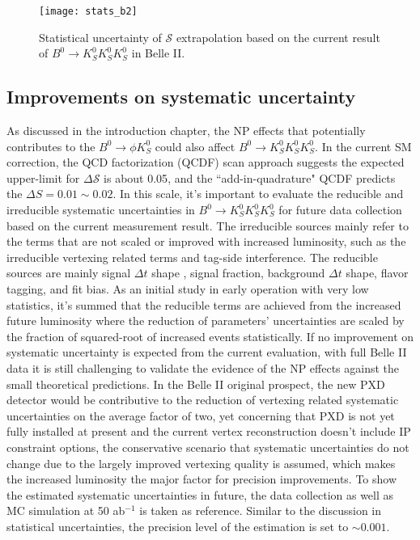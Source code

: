 \begin{figure}[htpb]
\centering
\texttt{[image: stats\_b2]}
\caption{Statistical uncertainty of $\mathcal{S}$ extrapolation based on the current result of $B^0 \to K_S^0  K_S^0  K_S^0$ in Belle II.}
\label{fig:stats_future}
\end{figure}

\subsection{Improvements on systematic uncertainty}
As discussed in the introduction chapter, the NP effects that potentially contributes to the $B^0\to \phi K_S^0$ could also affect $B^0 \to K_S^0  K_S^0  K_S^0$. In the current SM correction, the QCD factorization (QCDF) scan approach suggests the expected upper-limit for $\Delta \mathcal{S}$ is about 0.05\cite{b2book}, and the ``add-in-quadrature" QCDF predicts the $\Delta S = 0.01 \sim 0.02$\cite{b2book}. In this scale, it's important to evaluate the reducible and irreducible systematic uncertainties in $B^0 \to K_S^0  K_S^0  K_S^0$ for future data collection based on the current measurement result. 
The irreducible sources mainly refer to the terms that are not scaled or improved with increased luminosity, such as the irreducible vertexing related terms and tag-side interference. The reducible sources are mainly signal $\Delta t$ shape , signal fraction, background $\Delta t$ shape, flavor tagging, and fit bias. As an initial study in early operation with very low statistics, it's summed that the reducible terms are achieved from the increased future luminosity where the reduction of parameters' uncertainties are scaled by the fraction of squared-root of increased events statistically. If no improvement on systematic uncertainty is expected from the current evaluation, with full Belle II data it is still challenging to validate the evidence of the NP effects against the small theoretical predictions. In the Belle II original prospect, the new PXD detector would be contributive to the reduction of vertexing related systematic uncertainties on the average factor of two\cite{b2book}, yet concerning that PXD is not yet fully installed at present and the current vertex reconstruction doesn't include IP constraint options, the conservative scenario that systematic uncertainties do not change due to the largely improved vertexing quality is assumed, which makes the increased luminosity the major factor for precision improvements. To show the estimated systematic uncertainties in future, the data collection as well as MC simulation at 50 ab$^{-1}$ is taken as reference. Similar to the discussion in statistical uncertainties, the precision level of the estimation is set to $\sim 0.001$.

